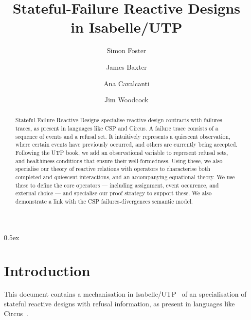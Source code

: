 \documentclass[11pt,a4paper]{article}
\begin{document}
\title{Stateful-Failure Reactive Designs in Isabelle/UTP}

\author{Simon Foster \and James Baxter \and Ana Cavalcanti \and Jim Woodcock}

\maketitle

\begin{abstract}
  Stateful-Failure Reactive Designs specialise reactive design contracts with failures traces,
  as present in languages like CSP and Circus. A failure trace consists of a sequence of events
  and a refusal set. It intuitively represents a quiescent observation, where certain events have
  previously occurred, and others are currently being accepted. Following the UTP book, we add 
  an observational variable to represent refusal sets, and healthiness conditions that ensure 
  their well-formedness. Using these, we also specialise our theory of reactive relations with 
  operators to characterise both completed and quiescent interactions, and an accompanying
  equational theory. We use these to define the core operators --- including assignment, event occurence, 
  and external choice --- and specialise our proof strategy to support these. We also demonstrate 
  a link with the CSP failures-divergences semantic model.
\end{abstract}

\tableofcontents

\parindent 0pt\parskip 0.5ex

\section{Introduction}

This document contains a mechanisation in Isabelle/UTP~\cite{Foster16a} of an specialisation of
stateful reactive designs with refusal information, as present in languages like 
Circus~\cite{Oliveira2005-PHD}.





\end{document}
